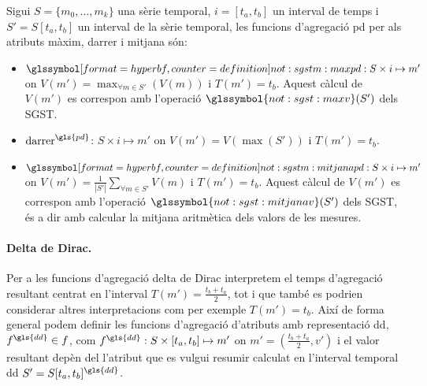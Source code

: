 \begin{definition}
  Sigui $S=\{m_0,\dotsc,m_k\}$ una sèrie temporal, $i=[t_a,t_b]$ un
  interval de temps i $S'=S[t_a,t_b]$ un interval de la sèrie
  temporal, les funcions d'agregació \gls{pd} per als atributs màxim,
  darrer i mitjana són:
  \begin{itemize}

  \item $\glssymboldef{not:sgstm:maxpd}: S \times i \mapsto
    m'$ on $V(m') = \max_{\forall m \in S'}(V(m))$ i
    $T(m')=t_b$. Aquest càlcul de $V(m')$ es correspon amb l'operació
    $\glssymbol{not:sgst:maxv}(S')$ dels \gls{SGST}.  \label{def:sgstm:maxpd}

\item $\operatorname{darrer}^{\gls{pd}}$: $S \times i \mapsto m'$ on $V(m') =
  V(\max(S'))$ i $T(m')=t_b$.

\item $\glssymboldef{not:sgstm:mitjanapd}: S \times i \mapsto m'$ on $V(m') =
  \frac{1}{|S'|} \sum\limits_{\forall m\in S'} V(m)$ i $T(m')=t_b$. Aquest càlcul de
  $V(m')$ es correspon amb l'operació $\glssymbol{not:sgst:mitjanav}(S')$
  dels \gls{SGST}, és a dir amb calcular la mitjana aritmètica dels
  valors de les mesures. \label{def:sgstm:mitjanapd}
\end{itemize}

\end{definition}



\paragraph{Delta de Dirac.} 
Per a les funcions d'agregació delta de Dirac interpretem el temps
d'agregació resultant centrat en l'interval $T(m')=\frac{t_b+t_a}{2}$,
tot i que també es podrien considerar altres interpretacions com per
exemple $T(m')=t_b$. Així de forma general podem definir les funcions
d'agregació d'atributs amb representació \gls{dd}, $f^{\gls{dd}}\in
f$, com $f^{\gls{dd}}: S \times [t_a,t_b] \mapsto m'$ on
$m'=(\frac{t_b+t_a}{2},v')$ i el valor resultant depèn del l'atribut
que es vulgui resumir calculat en l'interval temporal \gls{dd}
$S'=S[t_a,t_b]^{\gls{dd}}$.


